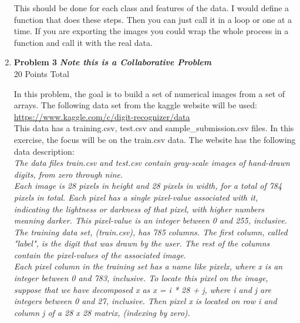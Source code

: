 \documentclass{article}
\begin{document}
\begin{enumerate}
This should be done for each class and features of the data. I would define a function that does these steps. Then you can just call it in a loop or one at a time. If you are exporting the images you could wrap the whole process in a function and call it with the real data.

\pagebreak

\pagebreak

    \item \textbf{Problem 3 } \textbf{\emph{Note this is a Collaborative Problem}}\\
    20 Points Total 
    
    In this problem, the goal is to build a set of numerical images from a set of arrays. The following data set from the kaggle website will be used: \href{https://www.kaggle.com/c/digit-recognizer/data}{https://www.kaggle.com/c/digit-recognizer/data}\\
	This data has a training.csv, test.csv and  sample\_submission.csv files. In this exercise, the focus will be on the train.csv data. The website has the following data description:\\
	
	\textit{The data files train.csv and test.csv contain gray-scale images of hand-drawn digits, from zero through nine.}\\

\textit{Each image is 28 pixels in height and 28 pixels in width, for a total of 784 pixels in total. Each pixel has a single pixel-value associated with it, indicating the lightness or darkness of that pixel, with higher numbers meaning darker. This pixel-value is an integer between 0 and 255, inclusive.}\\

\textit{The training data set, (train.csv), has 785 columns. The first column, called "label", is the digit that was drawn by the user. The rest of the columns contain the pixel-values of the associated image.}\\

\textit{Each pixel column in the training set has a name like pixelx, where x is an integer between 0 and 783, inclusive. To locate this pixel on the image, suppose that we have decomposed x as x = i * 28 + j, where i and j are integers between 0 and 27, inclusive. Then pixel x is located on row i and column j of a 28 x 28 matrix, (indexing by zero).}\\


\end{enumerate}
\end{document}
